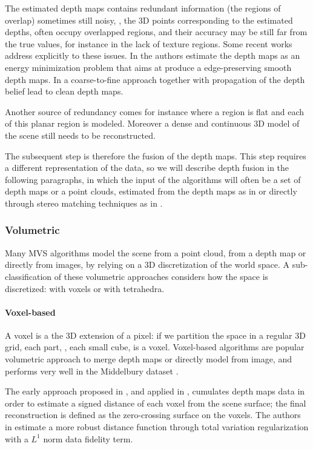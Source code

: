 The estimated depth maps contains redundant information (the regions of overlap) sometimes still noisy, \ie, the 3D points corresponding to the estimated depths, often occupy overlapped regions, and their accuracy may be still far from the true values, for instance in the lack of texture regions.
Some recent works address explicitly to these issues. 
In \cite{semerjian2014new} the authors estimate the depth maps as an energy minimization problem that aims at produce a edge-preserving smooth depth maps.
In \cite{wei2014multi} a coarse-to-fine approach together with propagation of the depth belief lead to clean depth maps.

Another source of redundancy comes for instance where a region is flat and each of this planar region is modeled. Moreover a dense and continuous 3D model of the scene still needs to be reconstructed.

The subsequent step is therefore the fusion of the depth maps. This step requires a different representation of the data, so we will describe depth fusion in the following paragraphs, in which the input of the algorithms will often be a set of depth maps or a point clouds, estimated from the depth maps  as in \cite{curless1996volumetric} or directly through stereo matching techniques as in \cite{bradley2008accurate,labatut2007efficient,vu_et_al_2012}.


\subsubsection{Volumetric}
Many MVS algorithms model the scene from a point cloud, from a depth map or directly from images, by relying on a 3D discretization of the world space.
A sub-classification of these volumetric approaches considers how the space is discretized: with voxels or with tetrahedra.


\paragraph{Voxel-based}
A voxel is a the 3D extension of a pixel: if we partition the space in a regular 3D grid, each part, \ie, each small cube, is a voxel.
Voxel-based  algorithms are popular volumetric approach to merge depth maps or directly model from image, and performs very well in the Middelbury dataset \cite{Seitz_et_al06}.

The early approach proposed in \cite{curless1996volumetric}, and applied in \cite{goesele2006multi}, cumulates depth maps data in order to estimate a signed distance of each voxel from the scene surface; the final reconstruction is defined as the zero-crossing surface on the voxels.
The authors in \cite{zach2007globally} estimate a more robust distance function through total variation regularization with a $L^1$ norm data fidelity term.

